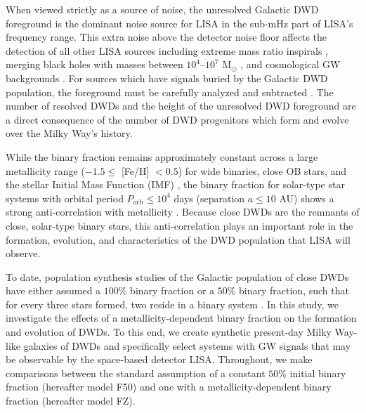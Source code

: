 \documentclass[twocolumn, linenumbers]{aastex631}
\begin{document}
When viewed strictly as a source of noise, the unresolved Galactic DWD foreground is the dominant noise source for LISA in the sub-mHz part of LISA's frequency range. This extra noise above the detector noise floor affects the detection of all other LISA sources including extreme mass ratio inspirals \citep[e.g.,][]{Berti2006, Barack2007, Babak2017, Moore2017}, merging black holes with masses between $10^4$--$10^7$ M$_{\odot}$ \citep[e.g.,][]{Klein2016, Bellovary2019}, and cosmological GW backgrounds \citep[e.g.,][]{Bartolo2016, Caprini2016, Caldwell2019}. For sources which have signals buried by the Galactic DWD population, the foreground must be carefully analyzed and subtracted \citep[][]{Adams2014,Cornish2020,Littenberg2020,Boileau2021}. The number of resolved DWDs and the height of the unresolved DWD foreground are a direct consequence of the number of DWD progenitors which form and evolve over the Milky Way's history. 

While the binary fraction remains approximately constant across a large metallicity range ($-1.5 \leq$ [Fe/H] $< 0.5$) for wide binaries, close OB stars, and the stellar Initial Mass Function (IMF) \citep{Moe2017, Moe2019}, the binary fraction for solar-type star systems with orbital period $P_{\text{orb}}\leq 10^4$ days (separation $a \leq 10$ AU) shows a strong anti-correlation with metallicity \citep[e.g.][]{Badenes2018, Moe2019, Mazzola2020, Price-Whelan2020}. Because close DWDs are the remnants of close, solar-type binary stars, this anti-correlation plays an important role in the formation, evolution, and characteristics of the DWD population that LISA will observe.


To date, population synthesis studies of the Galactic population of close DWDs have either assumed a $100\%$ binary fraction or a $50\%$ binary fraction, such that for every three stars formed, two reside in a binary system \citep{Nelemans2001a, Yu2013, Korol2017, Lamberts2019}. In this study, we investigate the effects of a metallicity-dependent binary fraction on the formation and evolution of DWDs. To this end, we create synthetic present-day Milky Way-like galaxies of DWDs and specifically select systems with GW signals that may be observable by the space-based detector LISA. Throughout, we make comparisons between the standard assumption of a constant $50\%$ initial binary fraction (hereafter model F50) and one with a metallicity-dependent binary fraction (hereafter model FZ).  
\end{document}
